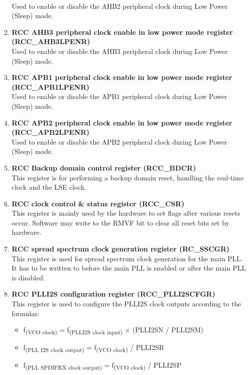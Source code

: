 \documentclass[footheight=20pt, footsepline, headheight=20pt, headsepline]{scrartcl}
\begin{document}
\begin{enumerate}
    \\ Used to enable or disable the AHB2 peripheral clock during Low Power (Sleep) mode.
    \item \textbf{RCC AHB3 peripheral clock enable in low power mode register (RCC\_AHB3LPENR)}
    \\ Used to enable or disable the AHB3 peripheral clock during Low Power (Sleep) mode.
    \item \textbf{RCC APB1 peripheral clock enable in low power mode register (RCC\_APB1LPENR)}
    \\ Used to enable or disable the APB1 peripheral clock during Low Power (Sleep) mode.
    \item \textbf{RCC APB2 peripheral clock enable in low power mode register (RCC\_APB2LPENR)}
    \\ Used to enable or disable the APB2 peripheral clock during Low Power (Sleep) mode.
    \item \textbf{RCC Backup domain control register (RCC\_BDCR)}
        \\ This register is for performing a backup domain reset, handling the real-time clock and the LSE clock.
    \item \textbf{RCC clock control \& status register (RCC\_CSR)}
        \\ This register is mainly used by the hardware to set flags after various resets occur. Software may write to the RMVF bit to clear all reset bits set by hardware.
    \item \textbf{RCC spread spectrum clock generation register (RC\_SSCGR)}
        \\ This register is used for spread spectrum clock generation for the main PLL. It has to be written to before the main PLL is enabled or after the main PLL is disabled.
    \item \textbf{RCC PLLI2S configuration register (RCC\_PLLI2SCFGR)}
        \\ This register is used to configure the PLLI2S clock outputs according to the formulas:
        \begin{itemize}
            \item f\textsubscript{(VCO clock)} = f\textsubscript{(PLLI2S clock input)} × (PLLI2SN / PLLI2SM)
            \item f\textsubscript{(PLL I2S clock output)} = f\textsubscript{(VCO clock)} / PLLI2SR
            \item f\textsubscript{(PLL SPDIFRX clock output)} = f\textsubscript{(VCO clock)} / PLLI2SP
        \end{itemize}

\end{enumerate}
\end{document}

